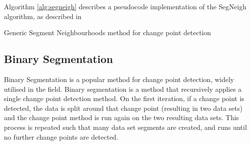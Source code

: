 \documentclass[../main.tex]{subfiles}
\begin{document}
Algorithm \autoref{alg:segneigh} describes a pseudocode implementation of the SegNeigh algorithm, as described in \cite{Eckley2011}\newline

\begin{algorithm}[H]
\label{alg:segneigh}
    \caption{Generic Segment Neighbourhoods method for change point detection}
    \DontPrintSemicolon
        
    \bigskip
        
\end{algorithm}

\subsection{Binary Segmentation}

Binary Segmentation \cite{Jackson2003} \cite{Yao1984} is a popular method for change point detection, widely utilised in the field. Binary segmentation is a method that recursively applies a single change point detection method. On the first iteration, if a change point is detected, the data is split around that change point (resulting in two data sets) and the change point method is run again on the two resulting data sets. This process is repeated such that many data set segments are created, and runs until no further change points are detected.
\end{document}
